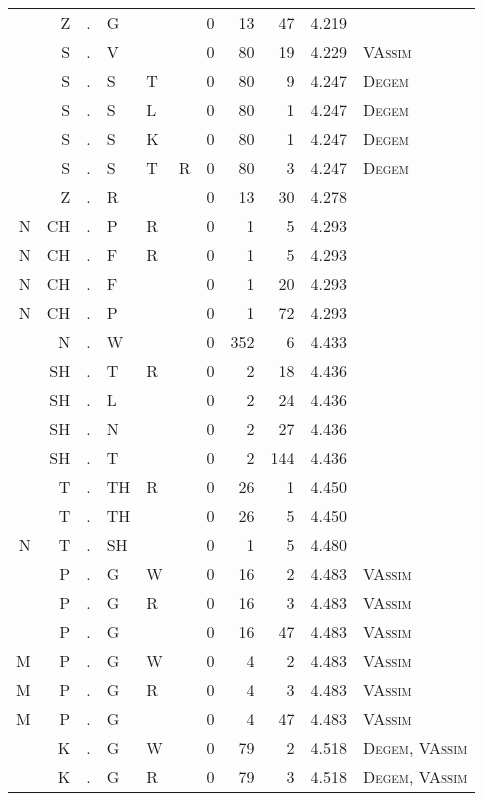 \begin{longtable}{r@{ } r@{ } c@{ } l@{ } l@{ } l@{ } r r r r l }
  & Z & . & G &   &   & 0 & 13 & 47 & 4.219 &  \\
  & S & . & V &   &   & 0 & 80 & 19 & 4.229 & \textsc{VAssim} \\
  & S & . & S & T &   & 0 & 80 & 9 & 4.247 & \textsc{Degem} \\
  & S & . & S & L &   & 0 & 80 & 1 & 4.247 & \textsc{Degem} \\
  & S & . & S & K &   & 0 & 80 & 1 & 4.247 & \textsc{Degem} \\
  & S & . & S & T & R & 0 & 80 & 3 & 4.247 & \textsc{Degem} \\
  & Z & . & R &   &   & 0 & 13 & 30 & 4.278 &  \\
N & CH & . & P & R &   & 0 & 1 & 5 & 4.293 &  \\
N & CH & . & F & R &   & 0 & 1 & 5 & 4.293 &  \\
N & CH & . & F &   &   & 0 & 1 & 20 & 4.293 &  \\
N & CH & . & P &   &   & 0 & 1 & 72 & 4.293 &  \\
  & N & . & W &   &   & 0 & 352 & 6 & 4.433 &  \\
  & SH & . & T & R &   & 0 & 2 & 18 & 4.436 &  \\
  & SH & . & L &   &   & 0 & 2 & 24 & 4.436 &  \\
  & SH & . & N &   &   & 0 & 2 & 27 & 4.436 &  \\
  & SH & . & T &   &   & 0 & 2 & 144 & 4.436 &  \\
  & T & . & TH & R &   & 0 & 26 & 1 & 4.450 &  \\
  & T & . & TH &   &   & 0 & 26 & 5 & 4.450 &  \\
N & T & . & SH &   &   & 0 & 1 & 5 & 4.480 &  \\
  & P & . & G & W &   & 0 & 16 & 2 & 4.483 & \textsc{VAssim} \\
  & P & . & G & R &   & 0 & 16 & 3 & 4.483 & \textsc{VAssim} \\
  & P & . & G &   &   & 0 & 16 & 47 & 4.483 & \textsc{VAssim} \\
M & P & . & G & W &   & 0 & 4 & 2 & 4.483 & \textsc{VAssim} \\
M & P & . & G & R &   & 0 & 4 & 3 & 4.483 & \textsc{VAssim} \\
M & P & . & G &   &   & 0 & 4 & 47 & 4.483 & \textsc{VAssim} \\
  & K & . & G & W &   & 0 & 79 & 2 & 4.518 & \textsc{Degem}, \textsc{VAssim} \\
  & K & . & G & R &   & 0 & 79 & 3 & 4.518 & \textsc{Degem}, \textsc{VAssim} \\

\end{longtable}
